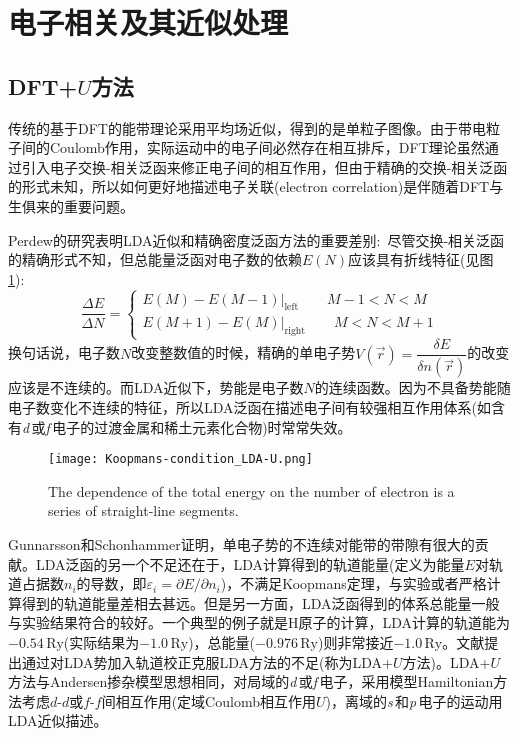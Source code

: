 \section{电子相关及其近似处理}
\subsection{DFT+$U$方法}
传统的基于DFT的能带理论采用平均场近似，得到的是单粒子图像。由于带电粒子间的\textrm{Coulomb}作用，实际运动中的电子间必然存在相互排斥，\textrm{DFT}理论虽然通过引入电子交换-相关泛函来修正电子间的相互作用，但由于精确的交换-相关泛函的形式未知，所以如何更好地描述电子关联(electron correlation)是伴随着\textrm{DFT}与生俱来的重要问题。

\textrm{Perdew}的研究表明LDA近似和精确密度泛函方法的重要差别\cite{PRL49-1691_1982}:~尽管交换-相关泛函的精确形式不知，但总能量泛函对电子数的依赖$E(N)$应该具有折线特征(见图\ref{exact-DFT}):~
	\begin{displaymath}
		\dfrac{\Delta E}{\Delta N}=\left\{
		\begin{aligned}
			E(M)-E(M-1)|_{\mathrm{left}}\qquad M-1<N<M\\
			E(M+1)-E(M)|_{\mathrm{right}}\qquad M<N<M+1 
		\end{aligned}\right.
	\end{displaymath}
换句话说，电子数$N$改变整数值的时候，精确的单电子势$V(\vec r)=\dfrac{\delta E}{\delta n(\vec r)}$的改变应该是不连续的。而LDA近似下，势能是电子数$N$的连续函数。因为不具备势能随电子数变化不连续的特征，所以LDA泛函在描述电子间有较强相互作用体系(如含有{\textit d}\,或{\textit f}\,电子的过渡金属和稀土元素化合物)时常常失效。

\begin{figure}[h!]
\centering
\vspace*{-0.4in}
\texttt{[image: Koopmans-condition\_LDA-U.png]}
\caption{\small \textrm{The dependence of the total energy on the number of electron is a series of straight-line segments.}}%
\label{exact-DFT}
\end{figure}

Gunnarsson和Schonhammer\cite{PRL56-1968_1986}证明，单电子势的不连续对能带的带隙有很大的贡献。LDA泛函的另一个不足还在于，LDA计算得到的轨道能量(定义为能量$E$对轨道占据数$n_i$的导数，即$\varepsilon_i=\partial E/\partial n_i$)，不满足\textrm{Koopmans}定理\cite{Physica1-104_1933}，与实验或者严格计算得到的轨道能量差相去甚远。但是另一方面，LDA泛函得到的体系总能量一般与实验结果符合的较好。一个典型的例子就是\textrm{H}原子的计算，LDA计算的轨道能为$-0.54\,\mathrm{Ry}$(实际结果为$-1.0\,\mathrm{Ry}$)，总能量($-0.976\,\mathrm{Ry}$)则非常接近$-1.0\,\mathrm{Ry}$\cite{PRB37-9919_1988}。文献提出通过对LDA势加入轨道校正克服LDA方法的不足(称为LDA+$U$方法)。LDA+$U$方法与\textrm{Andersen}掺杂模型\cite{PR124-41_1961}思想相同，对局域的{\textit d}\,或{\textit f}\,电子，采用模型Hamiltonian方法考虑$d$-$d$或$f$-$f$间相互作用(定域Coulomb相互作用$U$)，离域的{\textit s}\,和{\textit p}\,电子的运动用LDA近似描述。

